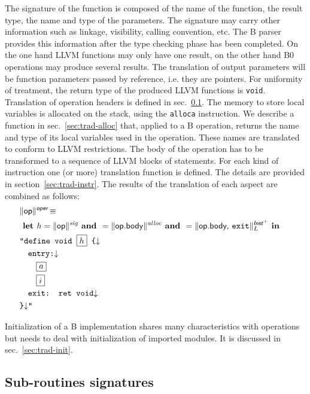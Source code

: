 \documentclass{llncs}
\newcommand{\trad}[2]{\ensuremath{\lVert \textsf{#1} \rVert^{\textit{#2}}}}
\newcommand{\nl}[0]{\ensuremath{\downarrow}}
\DeclareMathOperator{\isdef}{\equiv}
\newcommand{\llvm}[1]{\texttt{#1}}
\newcommand{\B}[1]{\textsf{#1}}
\newcommand{\ListOf}[1]{$\mbox{#1}^+$}
\newcommand{\LET}[0]{\textbf{ let }}
\newcommand{\IN}[0]{\textbf{ in }}
\newcommand{\AND}[1]{\textbf{ and }}
\newcommand{\PH}[1]{\framebox{$#1$}}
\begin{document}
The signature of the function is composed of the name of the function, the
result type, the name and type of the parameters. The signature may carry other
information such as linkage, visibility, calling convention, etc. The B parser
provides this information after the type checking phase has been completed.  On
the one hand LLVM functions may only have one result, on the other hand B0
operations may produce several results. The translation of output parameters
will be function parameters passed by reference, i.e. they are pointers. For
uniformity of treatment, the return type of the produced LLVM functions is
\llvm{void}. Translation of operation headers is defined in
sec.~\ref{sec:trad-header}. The memory to store local variables is allocated on
the stack, using the \llvm{alloca} instruction. We describe a function in
sec.~\ref{sec:trad-alloc} that, applied to a B operation, returns the name and
type of its local variables used in the operation. These names are translated to
conform to LLVM restrictions. The body of the operation has to be transformed to
a sequence of LLVM blocks of statements. For each kind of instruction one (or
more) translation function is defined. The details are provided in
section~\ref{sec:trad-instr}.  The results of the translation of each aspect are
combined as follows:
\begin{align*}
\begin{split}
  \lefteqn{\trad{\B{op}}{\B{oper}} \isdef} \\
  & \LET h = \trad{\B{op}}{sig} \AND   a = \trad{\B{op.body}}{alloc} \AND i = \trad{\B{op.body}, \llvm{exit}}{\ListOf{\B{Inst}}}_L \IN  \\
  & \llvm{"define void \PH{h} \{\nl} \\
  & \quad \llvm{entry:\nl} \\
  & \quad \quad \PH{a} \\
  & \quad \quad \PH{i} \\
  & \quad \llvm{exit: ret void\nl} \\
  & \llvm{\}\nl"}
\end{split}
\end{align*}

Initialization of a B implementation shares many characteristics with operations
but needs to deal with initialization of imported modules. It is discussed in
sec.~\ref{sec:trad-init}.

\subsection{Sub-routines signatures}
\label{sec:trad-header}
\end{document}
